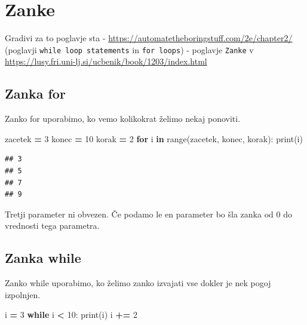 \documentclass[
]{book}
\newenvironment{Shaded}{\begin{snugshade}}{\end{snugshade}}
\newcommand{\BuiltInTok}[1]{#1}
\newcommand{\ControlFlowTok}[1]{\textcolor[rgb]{0.13,0.29,0.53}{\textbf{#1}}}
\newcommand{\DecValTok}[1]{\textcolor[rgb]{0.00,0.00,0.81}{#1}}
\newcommand{\KeywordTok}[1]{\textcolor[rgb]{0.13,0.29,0.53}{\textbf{#1}}}
\newcommand{\NormalTok}[1]{#1}
\newcommand{\OperatorTok}[1]{\textcolor[rgb]{0.81,0.36,0.00}{\textbf{#1}}}
\begin{document}
\hypertarget{zanke}{%
\chapter{Zanke}\label{zanke}}

Gradivi za to poglavje sta
- \url{https://automatetheboringstuff.com/2e/chapter2/} (poglavji \texttt{while\ loop\ statements} in \texttt{for\ loops})
- poglavje \texttt{Zanke} v \url{https://lusy.fri.uni-lj.si/ucbenik/book/1203/index.html}

\hypertarget{zanka-for}{%
\section{Zanka for}\label{zanka-for}}

Zanko for uporabimo, ko vemo kolikokrat želimo nekaj ponoviti.

\begin{Shaded}
\begin{Highlighting}[]
\NormalTok{zacetek }\OperatorTok{=} \DecValTok{3}
\NormalTok{konec }\OperatorTok{=} \DecValTok{10}
\NormalTok{korak }\OperatorTok{=} \DecValTok{2}
\ControlFlowTok{for}\NormalTok{ i }\KeywordTok{in} \BuiltInTok{range}\NormalTok{(zacetek, konec, korak):}
    \BuiltInTok{print}\NormalTok{(i)}
\end{Highlighting}
\end{Shaded}

\begin{verbatim}
## 3
## 5
## 7
## 9
\end{verbatim}

Tretji parameter ni obvezen. Če podamo le en parameter bo šla zanka od 0 do
vrednosti tega parametra.

\hypertarget{zanka-while}{%
\section{Zanka while}\label{zanka-while}}

Zanko while uporabimo, ko želimo zanko izvajati vse dokler je nek pogoj izpolnjen.

\begin{Shaded}
\begin{Highlighting}[]
\NormalTok{i }\OperatorTok{=} \DecValTok{3}
\ControlFlowTok{while}\NormalTok{ i }\OperatorTok{\textless{}} \DecValTok{10}\NormalTok{:}
    \BuiltInTok{print}\NormalTok{(i)}
\NormalTok{    i }\OperatorTok{+=} \DecValTok{2}
\end{Highlighting}
\end{Shaded}
\end{document}
